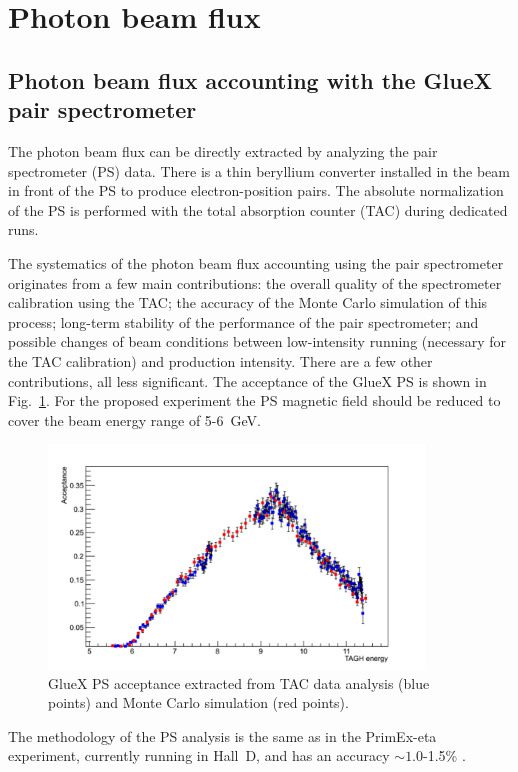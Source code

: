 \section{Photon beam flux  \label{sec:flux}   }

\subsection{Photon beam flux accounting with the GlueX pair spectrometer}
The photon beam flux can be directly extracted by analyzing the pair
spectrometer (PS) data. There is a thin beryllium converter installed in
the beam in front of the PS to produce electron-position pairs.
The absolute normalization of the PS
is performed with the total absorption counter (TAC) during dedicated
runs.

The systematics of the photon beam flux accounting using the pair
spectrometer originates from a few main contributions: the overall
quality of the spectrometer calibration using the TAC; the accuracy
of the Monte Carlo
simulation of this process; long-term stability of the performance of the
pair spectrometer; and possible changes of beam conditions between
low-intensity running (necessary for the TAC
calibration) and production intensity.  There are a few other
contributions, all less significant. The acceptance of the GlueX PS \cite{hdnote3684} is shown
in Fig.~\ref{fig:psacc}. For the proposed experiment the PS magnetic field
should be reduced to cover the beam energy range of 5-6~GeV.
\begin{figure}[tpb]
\begin{center}
\includegraphics[width=10cm,angle=0]{figures/ps_acceptance.pdf}
\end{center}
\caption{GlueX PS acceptance extracted from TAC data analysis (blue
  points) and Monte Carlo simulation (red points).}
\label{fig:psacc}
\end{figure}
The methodology of the PS analysis is the same as in the
PrimEx-eta experiment, currently running in Hall~D, and has an accuracy
$\sim 1.0$-1.5\% \cite{PrimexDexp}.

